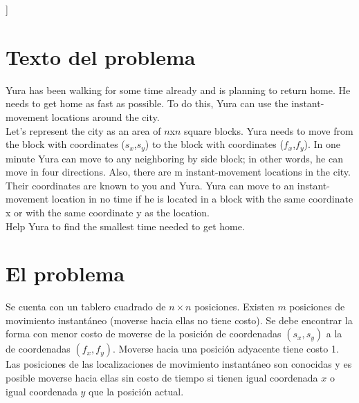 \documentclass[a4paper,12pt,twocolumn]{article}
\begin{document}



\vspace{0.8cm}
]



\section{Texto del problema} 

	Yura has been walking for some time already and is planning to return home. He needs to get home as fast as possible. To do this, Yura can use the instant-movement locations around the city.\\
	Let's represent the city as an area of $n$x$n$ square blocks. Yura needs to move from the block with coordinates ($s_x$,$s_y$) to the block with coordinates ($f_x$,$f_y$). In one minute Yura can move to any neighboring by side block; in other words, he can move in four directions. Also, there are m instant-movement locations in the city. Their coordinates are known to you and Yura. Yura can move to an instant-movement location in no time if he is located in a block with the same coordinate x or with the same coordinate y as the location.\\
	Help Yura to find the smallest time needed to get home.

\section{El problema} 
   Se cuenta con un tablero cuadrado de $n\times n$ posiciones. Existen $m$ posiciones de movimiento instantáneo (moverse hacia ellas no tiene costo). Se debe encontrar la forma con menor costo de moverse de la posición de coordenadas $(s_x, s_y)$ a la de coordenadas $(f_x, f_y)$. Moverse hacia una posición adyacente tiene costo 1. Las posiciones de las localizaciones de movimiento instantáneo son conocidas y es posible moverse hacia ellas sin costo de tiempo si tienen igual coordenada $x$ o igual coordenada $y$ que la posición actual.
  
\end{document}
